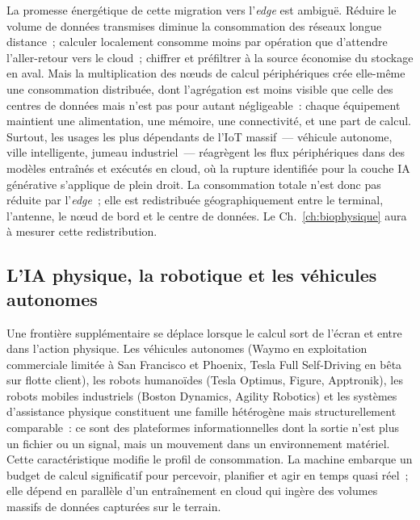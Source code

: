 %
La promesse énergétique de cette migration vers l'\emph{edge} est ambiguë. Réduire le volume de données transmises diminue la consommation des réseaux longue distance~; calculer localement consomme moins par opération que d'attendre l'aller-retour vers le cloud~; chiffrer et préfiltrer à la source économise du stockage en aval. Mais la multiplication des nœuds de calcul périphériques crée elle-même une consommation distribuée, dont l'agrégation est moins visible que celle des centres de données mais n'est pas pour autant négligeable~: chaque équipement maintient une alimentation, une mémoire, une connectivité, et une part de calcul. Surtout, les usages les plus dépendants de l'IoT massif~--- véhicule autonome, ville intelligente, jumeau industriel~--- réagrègent les flux périphériques dans des modèles entraînés et exécutés en cloud, où la rupture identifiée pour la couche IA générative s'applique de plein droit. La consommation totale n'est donc pas réduite par l'\emph{edge}~; elle est redistribuée géographiquement entre le terminal, l'antenne, le nœud de bord et le centre de données. Le Ch.~\ref{ch:biophysique} aura à mesurer cette redistribution.


\subsection{L'IA physique, la robotique et les véhicules autonomes}\label{subsec:physical_ai}

%
Une frontière supplémentaire se déplace lorsque le calcul sort de l'écran et entre dans l'action physique. Les véhicules autonomes (Waymo en exploitation commerciale limitée à San Francisco et Phoenix, Tesla Full Self-Driving en bêta sur flotte client), les robots humanoïdes (Tesla Optimus, Figure, Apptronik), les robots mobiles industriels (Boston Dynamics, Agility Robotics) et les systèmes d'assistance physique constituent une famille hétérogène mais structurellement comparable~: ce sont des plateformes informationnelles dont la sortie n'est plus un fichier ou un signal, mais un mouvement dans un environnement matériel. Cette caractéristique modifie le profil de consommation. La machine embarque un budget de calcul significatif pour percevoir, planifier et agir en temps quasi réel~; elle dépend en parallèle d'un entraînement en cloud qui ingère des volumes massifs de données capturées sur le terrain.

